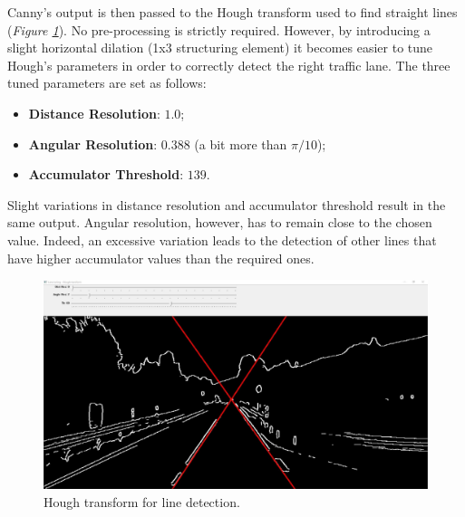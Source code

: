 \documentclass{article}
\begin{document}
Canny's output is then passed to the Hough transform used to find straight lines (\textit{Figure \ref{img_hough_lines}}). No pre-processing is strictly required. However, by introducing a slight horizontal dilation (1x3 structuring element) it becomes easier to tune Hough's parameters in order to correctly detect the right traffic lane. The three tuned parameters are set as follows:
\begin{itemize}
\item \textbf{Distance Resolution}: $1.0$;
\item \textbf{Angular Resolution}: $0.388$ (a bit more than $\pi/10$);
\item \textbf{Accumulator Threshold}: $139$.
\end{itemize} 
Slight variations in distance resolution and accumulator threshold result in the same output. Angular resolution, however, has to remain close to the chosen value. Indeed, an excessive variation leads to the detection of other lines that have higher accumulator values than the required ones.

\begin{figure}[h]
\begin{center}
\includegraphics[width=1\textwidth]{images/hough_lines}
\caption{\footnotesize{Hough transform for line detection.}}
\label{img_hough_lines}
\end{center}
\end{figure}
\end{document}
